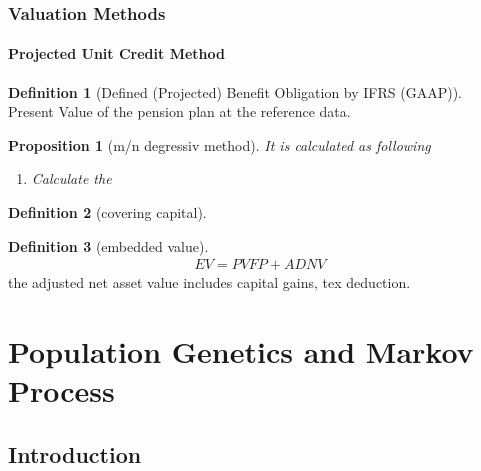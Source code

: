 \documentclass[a4paper,11pt]{book}
\newtheorem{proposition}[theorem]{Proposition}
\theoremstyle{definition}
\newtheorem{definition}{Definition}[section]
\theoremstyle{remark}
\begin{document}
\subsection{Valuation Methods}
\subsubsection{Projected Unit Credit Method}
\begin{definition}[Defined (Projected) Benefit Obligation by IFRS (GAAP)]
Present Value of the pension plan at the reference data.
\end{definition}


\begin{proposition}[m/n degressiv method]
	It is calculated as following 
	\begin{enumerate}
		\item Calculate the 
	\end{enumerate}
\end{proposition}



\begin{definition}[covering capital]
\end{definition}


\begin{definition}[embedded value]
\begin{align*}
	EV = PVFP + ADNV
\end{align*}
the adjusted net asset value includes capital gains, tex deduction. 
\end{definition}











\chapter{Population Genetics and Markov Process}
\section{Introduction}
\end{document}
